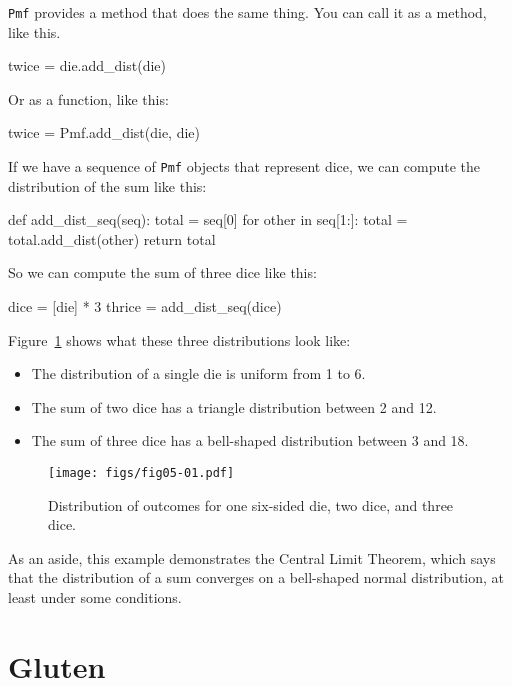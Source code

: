 \documentclass[12pt]{book}
\theoremstyle{exercise}
\newcommand{\py}[1]{{\tt #1}}%
\begin{document}
\py{Pmf} provides a method that does the same thing.
You can call it as a method, like this.

\begin{code}
twice = die.add_dist(die)
\end{code}

Or as a function, like this:

\begin{code}
twice = Pmf.add_dist(die, die)
\end{code}

If we have a sequence of \py{Pmf} objects that represent dice, we can compute the distribution of the sum like this:

\begin{code}
def add_dist_seq(seq):
    total = seq[0]
    for other in seq[1:]:
        total = total.add_dist(other)
    return total
\end{code}

So we can compute the sum of three dice like this:

\begin{code}
dice = [die] * 3
thrice = add_dist_seq(dice)
\end{code}

Figure~\ref{fig05-01} shows what these three distributions look like:

\begin{itemize}

\item The distribution of a single die is uniform from 1 to 6.

\item The sum of two dice has a triangle distribution between 2 and 12.

\item The sum of three dice has a bell-shaped distribution between 3 and 18.

\end{itemize}

\begin{figure}
\centerline{\texttt{[image: figs/fig05-01.pdf]}}
\caption{Distribution of outcomes for one six-sided die, two dice, and three dice.}
\label{fig05-01}
\end{figure}

As an aside, this example demonstrates the Central Limit Theorem, which says that the distribution of a sum converges on a bell-shaped normal distribution, at least under some conditions.

\section{Gluten}
\end{document}
